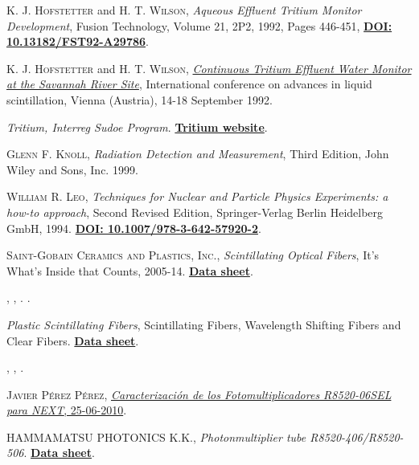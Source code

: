 \begin{thebibliography}{100}
 \textsc{K. J. Hofstetter} and \textsc{H. T. Wilson},
\textit{Aqueous Effluent Tritium Monitor Development}, Fusion Technology, Volume 21, 2P2, 1992, Pages 446-451, \href{https://doi.org/10.13182/FST92-A29786}{\textbf{DOI: 10.13182/FST92-A29786}}.

 \textsc{K. J. Hofstetter} and \textsc{H. T. Wilson},
\href{https://www.osti.gov/biblio/6865647-continuous-tritium-effluent-water-monitor-savannah-river-site}{\textit{Continuous Tritium Effluent Water Monitor at the Savannah River Site}}, International conference on advances in liquid scintillation, Vienna (Austria), 14-18 September 1992.

 \textit{Tritium, Interreg Sudoe Program}. 
\href{https://tritium-sudoe.eu/es-es/homepage}{\textbf{Tritium website}}.

 \textsc{Glenn F. Knoll}, 
\textit{Radiation Detection and Measurement}, Third Edition, John Wiley and Sons, Inc. 1999.

 \textsc{William R. Leo},
\textit{Techniques for Nuclear and Particle Physics Experiments: a how-to approach}, Second Revised Edition, Springer-Verlag Berlin Heidelberg GmbH, 1994. \href{https://doi.org/10.1007/978-3-642-57920-2}{\textbf{DOI: 10.1007/978-3-642-57920-2}}. 

 \textsc{Saint-Gobain Ceramics and Plastics, Inc.},
\textit{Scintillating Optical Fibers}, It's What's Inside that Counts, 2005-14. \href{https://www.crystals.saint-gobain.com/products/scintillating-fiber}{\textbf{Data sheet}}. 

 \textsc{},
\textit{}, . \href{}{\textbf{}}. 

\textit{Plastic Scintillating Fibers}, Scintillating Fibers, Wavelength Shifting Fibers and Clear Fibers. \href{https://www.kuraray.com/products/psf}{\textbf{Data sheet}}. 

 \textsc{},
\textit{}, \href{}{\textbf{}}. 

 \textsc{Javier Pérez Pérez},
 \href{https://next.ific.uv.es/cgi-bin/DocDB/public/ShowDocument?docid=48}{\textit{Caracterización de los Fotomultiplicadores R8520-06SEL para NEXT}, 25-06-2010}.

 \textsc{HAMMAMATSU PHOTONICS K.K.},
\textit{Photonmultiplier tube R8520-406/R8520-506}. \href{https://www.hamamatsu.com/eu/en/product/type/R8520-406/index.html}{\textbf{Data sheet}}.


\end{thebibliography}
